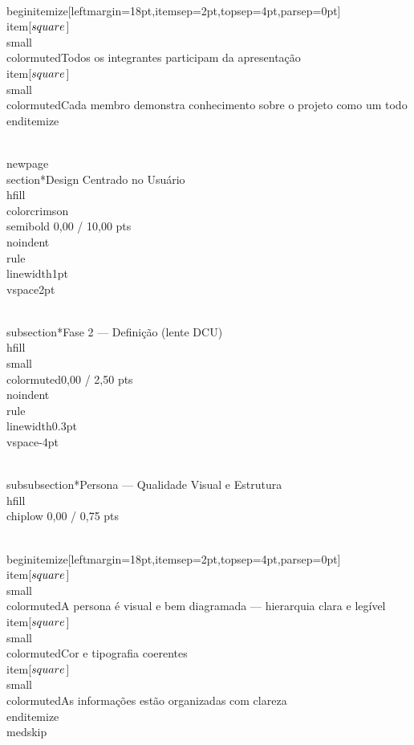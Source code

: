 \documentclass[11pt, a4paper]{article}
\newcommand{\chiplow}[1]{\colorbox{crimsondim}{\color{crimson}\semibold\small\strut\ #1\ }}
\begin{document}
\\begin{itemize}[leftmargin=18pt,itemsep=2pt,topsep=4pt,parsep=0pt]
  \\item[$\\square$] {\\small\\color{muted}Todos os integrantes participam da apresentação}
  \\item[$\\square$] {\\small\\color{muted}Cada membro demonstra conhecimento sobre o projeto como um todo}
\\end{itemize}

\\newpage
\\section*{Design Centrado no Usuário \\hfill {\\color{crimson}\\semibold 0,00 / 10,00 pts}}
\\noindent\\rule{\\linewidth}{1pt}\\vspace{2pt}

\\subsection*{Fase 2 — Definição (lente DCU) \\hfill {\\small\\color{muted}0,00 / 2,50 pts}}
\\noindent\\rule{\\linewidth}{0.3pt}\\vspace{-4pt}

\\subsubsection*{Persona — Qualidade Visual e Estrutura \\hfill {\\chiplow 0,00 / 0,75 pts}}

\\begin{itemize}[leftmargin=18pt,itemsep=2pt,topsep=4pt,parsep=0pt]
  \\item[$\\square$] {\\small\\color{muted}A persona é visual e bem diagramada — hierarquia clara e legível}
  \\item[$\\square$] {\\small\\color{muted}Cor e tipografia coerentes}
  \\item[$\\square$] {\\small\\color{muted}As informações estão organizadas com clareza}
\\end{itemize}
\\medskip
\end{document}
